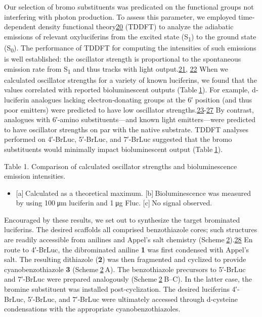 Our selection of bromo substituents was predicated on the functional
groups not interfering with photon production. To assess this parameter,
we employed time‐dependent density functional
theory{\protect\hyperlink{cbic201600564-bib-0020}{20}} (TDDFT) to
analyze the adiabatic emissions of relevant oxyluciferins from the
excited state (S\textsubscript{1}) to the ground state
(S\textsubscript{0}). The performance of TDDFT for computing the
intensities of such emissions is well established: the oscillator
strength is proportional to the spontaneous emission rate from
S\textsubscript{1} and thus tracks with light
output.{\protect\hyperlink{cbic201600564-bib-0021}{21},
\protect\hyperlink{cbic201600564-bib-0022}{22}} When we calculated
oscillator strengths for a variety of known luciferins, we found that
the values correlated with reported bioluminescent outputs
(Table \protect\hyperlink{cbic201600564-tbl-0001}{1}). For example,
{d}‐luciferin analogues lacking electron‐donating groups at the 6′
position (and thus poor emitters) were predicted to have low oscillator
strengths.{\protect\hyperlink{cbic201600564-bib-0023}{23}-\protect\hyperlink{cbic201600564-bib-0027}{27}}
By contrast, analogues with 6′‐amino substituents---and known light
emitters---were predicted to have oscillator strengths on par with the
native substrate. TDDFT analyses performed on 4′‐BrLuc, 5′‐BrLuc, and
7′‐BrLuc suggested that the bromo substituents would minimally impact
bioluminescent output
(Table \protect\hyperlink{cbic201600564-tbl-0001}{1}).

{Table 1. }Comparison of calculated oscillator strengths and
bioluminescence emission intensities.
\begin{itemize}
\tightlist
\item
  \protect\hypertarget{cbic201600564-tnote-0001}{}{{[}a{]} Calculated as
  a theoretical maximum. {[}b{]} Bioluminescence was measured by using
  100 μ{m} luciferin and 1 μg Fluc. {[}c{]} No signal observed.}
\end{itemize}

Encouraged by these results, we set out to synthesize the target
brominated luciferins. The desired scaffolds all comprised benzothiazole
cores; such structures are readily accessible from anilines and Appel's
salt chemistry
(Scheme \protect\hyperlink{cbic201600564-fig-5001}{2}).{\protect\hyperlink{cbic201600564-bib-0028}{28}}
En route to 4′‐BrLuc, the dibrominated aniline \textbf{1} was first
condensed with Appel's salt. The resulting dithiazole (\textbf{2}) was
then fragmented and cyclized to provide cyanobenzothiazole \textbf{3}
(Scheme \protect\hyperlink{cbic201600564-fig-5001}{2} A). The
benzothiazole precursors to 5′‐BrLuc and 7′‐BrLuc were prepared
analogously (Scheme \protect\hyperlink{cbic201600564-fig-5001}{2} B--C).
In the latter case, the bromine substituent was installed
post‐cyclization. The desired luciferins 4′‐BrLuc, 5′‐BrLuc, and
7′‐BrLuc were ultimately accessed through {d}‐cysteine condensations
with the appropriate cyanobenzothiazoles.

